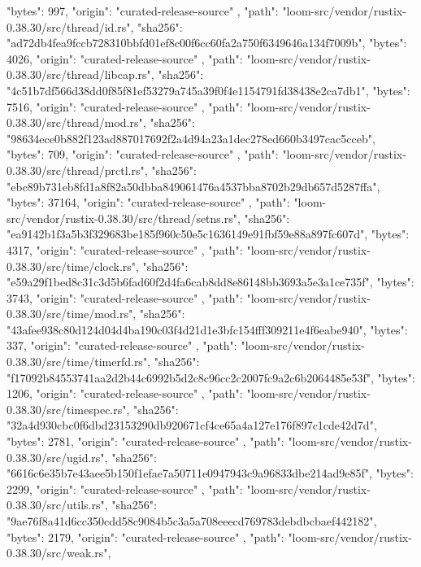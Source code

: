 {{      "bytes": 997,
      "origin": "curated-release-source"
    },
    {
      "path": "loom-src/vendor/rustix-0.38.30/src/thread/id.rs",
      "sha256": "ad72db4fea9fccb728310bbfd01ef8c00f6cc60fa2a750f6349646a134f7009b",
      "bytes": 4026,
      "origin": "curated-release-source"
    },
    {
      "path": "loom-src/vendor/rustix-0.38.30/src/thread/libcap.rs",
      "sha256": "4c51b7df566d38dd0f85f81ef53279a745a39f0f4e1154791fd38438e2ca7db1",
      "bytes": 7516,
      "origin": "curated-release-source"
    },
    {
      "path": "loom-src/vendor/rustix-0.38.30/src/thread/mod.rs",
      "sha256": "98634ece0b882f123ad887017692f2a4d94a23a1dec278ed660b3497cac5cceb",
      "bytes": 709,
      "origin": "curated-release-source"
    },
    {
      "path": "loom-src/vendor/rustix-0.38.30/src/thread/prctl.rs",
      "sha256": "ebc89b731eb8fd1a8f82a50dbba849061476a4537bba8702b29db657d5287ffa",
      "bytes": 37164,
      "origin": "curated-release-source"
    },
    {
      "path": "loom-src/vendor/rustix-0.38.30/src/thread/setns.rs",
      "sha256": "ea9142b1f3a5b3f329683be185f960c50e5c1636149e91fbf59e88a897fc607d",
      "bytes": 4317,
      "origin": "curated-release-source"
    },
    {
      "path": "loom-src/vendor/rustix-0.38.30/src/time/clock.rs",
      "sha256": "e59a29f1bed8c31c3d5b6fad60f2d4fa6cab8dd8e86148bb3693a5e3a1ce735f",
      "bytes": 3743,
      "origin": "curated-release-source"
    },
    {
      "path": "loom-src/vendor/rustix-0.38.30/src/time/mod.rs",
      "sha256": "43afee938c80d124d04d4ba190c03f4d21d1e3bfc154fff309211e4f6eabe940",
      "bytes": 337,
      "origin": "curated-release-source"
    },
    {
      "path": "loom-src/vendor/rustix-0.38.30/src/time/timerfd.rs",
      "sha256": "f17092b84553741aa2d2b44c6992b5d2c8c96cc2c2007fc9a2c6b2064485e53f",
      "bytes": 1206,
      "origin": "curated-release-source"
    },
    {
      "path": "loom-src/vendor/rustix-0.38.30/src/timespec.rs",
      "sha256": "32a4d930cbc0f6dbd23153290db920671cf4ce65a4a127e176f897c1cde42d7d",
      "bytes": 2781,
      "origin": "curated-release-source"
    },
    {
      "path": "loom-src/vendor/rustix-0.38.30/src/ugid.rs",
      "sha256": "6616c6e35b7e43aee5b150f1efae7a50711e0947943c9a96833dbe214ad9e85f",
      "bytes": 2299,
      "origin": "curated-release-source"
    },
    {
      "path": "loom-src/vendor/rustix-0.38.30/src/utils.rs",
      "sha256": "9ae76f8a41d6cc350cdd58c9084b5c3a5a708eeecd769783debdbcbaef442182",
      "bytes": 2179,
      "origin": "curated-release-source"
    },
    {
      "path": "loom-src/vendor/rustix-0.38.30/src/weak.rs",
}}
